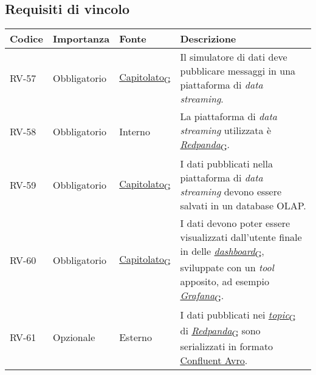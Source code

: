 \subsection{Requisiti di vincolo}
\begin{longtable}{|>{\centering\arraybackslash}m{}|>{\centering\arraybackslash}m{}|>{\centering\arraybackslash}m{}|>{\centering\arraybackslash}m{}|}
	\hline
	\textbf{Codice} & \textbf{Importanza} & \textbf{Fonte}                                                                                                    & \textbf{Descrizione}
	\\\hline
	\endfirsthead
	\hline
	\endhead
	RV-57           & Obbligatorio        & \href{https://7last.github.io/docs/rtb/documentazione-interna/glossario\#capitolato}{Capitolato\textsubscript{G}} & Il simulatore di dati deve pubblicare messaggi in una piattaforma di \textit{data streaming}.
	\\\hline
	RV-58           & Obbligatorio        & Interno                                                                                                           & La piattaforma di \textit{data streaming} utilizzata è \href{https://7last.github.io/docs/rtb/documentazione-interna/glossario\#redpanda}{\textit{Redpanda}\textsubscript{G}}.
	\\\hline
	RV-59           & Obbligatorio        & \href{https://7last.github.io/docs/rtb/documentazione-interna/glossario\#capitolato}{Capitolato\textsubscript{G}} & I dati pubblicati nella piattaforma di \textit{data streaming} devono essere salvati in un database OLAP.
	\\\hline
	RV-60           & Obbligatorio        & \href{https://7last.github.io/docs/rtb/documentazione-interna/glossario\#capitolato}{Capitolato\textsubscript{G}} & I dati devono poter essere visualizzati dall'utente finale in delle \href{https://7last.github.io/docs/rtb/documentazione-interna/glossario\#dashboard}{\textit{dashboard}\textsubscript{G}}, sviluppate con un \textit{tool} apposito, ad esempio \href{https://7last.github.io/docs/rtb/documentazione-interna/glossario\#grafana}{\textit{Grafana}\textsubscript{G}}.
	\\\hline
	RV-61           & Opzionale           & Esterno                                                                                                           & I dati pubblicati nei \href{https://7last.github.io/docs/rtb/documentazione-interna/glossario\#topic}{\textit{topic}\textsubscript{G}} di \href{https://7last.github.io/docs/rtb/documentazione-interna/glossario\#redpanda}{\textit{Redpanda}\textsubscript{G}} sono serializzati in formato \href{https://docs.confluent.io/platform/current/schema-registry/fundamentals/serdes-develop/serdes-avro.html}{\underline{Confluent Avro}}.

\end{longtable}
